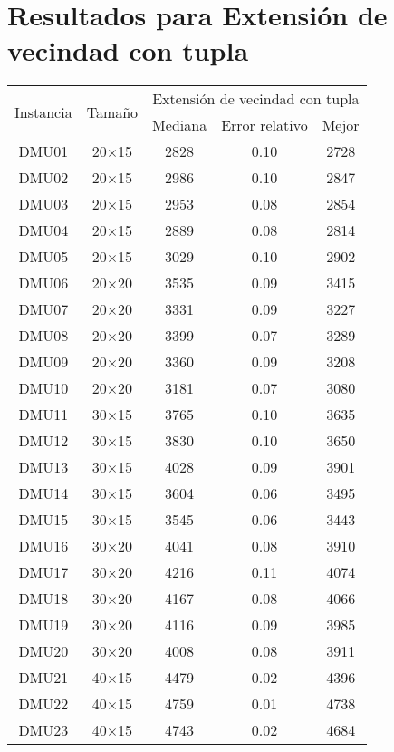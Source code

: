 \section{Resultados para Extensión de vecindad con tupla}

\begin{table}[H]
\centering
\begin{tabular}{@{}ccccc@{}}
\toprule
\multirow{2}{*}{Instancia} & \multirow{2}{*}{Tamaño} & \multicolumn{3}{c}{Extensión de vecindad con tupla} \\ \cmidrule(lr){3-5}
& & Mediana& Error relativo & Mejor  \\ \midrule
DMU01 & 20$\times$15 & 2828 & 0.10 & 2728\\ 
DMU02 & 20$\times$15 & 2986 & 0.10 & 2847\\ 
DMU03 & 20$\times$15 & 2953 & 0.08 & 2854\\ 
DMU04 & 20$\times$15 & 2889 & 0.08 & 2814\\ 
DMU05 & 20$\times$15 & 3029 & 0.10 & 2902\\ 
DMU06 & 20$\times$20 & 3535 & 0.09 & 3415\\ 
DMU07 & 20$\times$20 & 3331 & 0.09 & 3227\\ 
DMU08 & 20$\times$20 & 3399 & 0.07 & 3289\\ 
DMU09 & 20$\times$20 & 3360 & 0.09 & 3208\\ 
DMU10 & 20$\times$20 & 3181 & 0.07 & 3080\\ 
DMU11 & 30$\times$15 & 3765 & 0.10 & 3635\\ 
DMU12 & 30$\times$15 & 3830 & 0.10 & 3650\\ 
DMU13 & 30$\times$15 & 4028 & 0.09 & 3901\\ 
DMU14 & 30$\times$15 & 3604 & 0.06 & 3495\\ 
DMU15 & 30$\times$15 & 3545 & 0.06 & 3443\\ 
DMU16 & 30$\times$20 & 4041 & 0.08 & 3910\\ 
DMU17 & 30$\times$20 & 4216 & 0.11 & 4074\\ 
DMU18 & 30$\times$20 & 4167 & 0.08 & 4066\\ 
DMU19 & 30$\times$20 & 4116 & 0.09 & 3985\\ 
DMU20 & 30$\times$20 & 4008 & 0.08 & 3911\\ 
DMU21 & 40$\times$15 & 4479 & 0.02 & 4396\\ 
DMU22 & 40$\times$15 & 4759 & 0.01 & 4738\\ 
DMU23 & 40$\times$15 & 4743 & 0.02 & 4684\\ 

\end{tabular}
\end{table}
